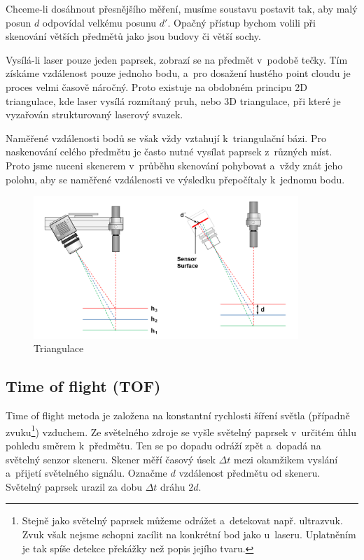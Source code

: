 \documentclass[12pt]{report}			%
\begin{document}
    			    Chceme-li dosáhnout přesnějšího měření, musíme soustavu postavit tak, aby malý posun $d$ odpovídal velkému posunu $d'$. Opačný přístup bychom volili při skenování větších předmětů jako jsou budovy či větší sochy. \cite{triangulace1}
    
    			    Vysílá-li laser pouze jeden paprsek, zobrazí se na předmět v~podobě tečky. Tím získáme vzdálenost pouze jednoho bodu, a~pro dosažení hustého point cloudu je proces velmi časově náročný. Proto existuje na obdobném principu 2D triangulace, kde laser vysílá rozmítaný pruh, nebo 3D triangulace, při které je vyzařován strukturovaný laserový svazek. \cite{triangulace2}
    
    			    Naměřené vzdálenosti bodů se však vždy vztahují k~triangulační bázi. Pro naskenování celého předmětu je často nutné vysílat paprsek z~různých míst. Proto jsme nuceni skenerem v~průběhu skenování pohybovat a~vždy znát jeho polohu, aby se naměřené vzdálenosti ve výsledku přepočítaly k~jednomu bodu.
    
    			    \begin{figure}[h]
                        \centering
                        \includegraphics[width=10cm]{images/triangulace.png}
                        \caption{Triangulace \cite{trinangulaceOBR}}
                        \label{fig:triangulace}
                    \end{figure}

			    \subsection{Time of flight (TOF)}

    			    Time of flight metoda je založena na konstantní rychlosti šíření světla (případně zvuku\footnote{Stejně jako světelný paprsek můžeme odrážet a~detekovat např. ultrazvuk. Zvuk však nejsme schopni zacílit na konkrétní bod jako u~laseru. Uplatněním je tak spíše detekce překážky než popis jejího tvaru.}) vzduchem. Ze světelného zdroje se vyšle světelný paprsek v~určitém úhlu pohledu směrem k~předmětu. Ten se po dopadu odráží zpět a~dopadá na světelný senzor skeneru. Skener měří časový úsek $\Delta t$ mezi okamžikem vyslání a~přijetí světelného signálu. Označme $d$ vzdálenost předmětu od skeneru. Světelný paprsek urazil za dobu $\Delta t$ dráhu $2d$. \cite{tof}
\end{document}
